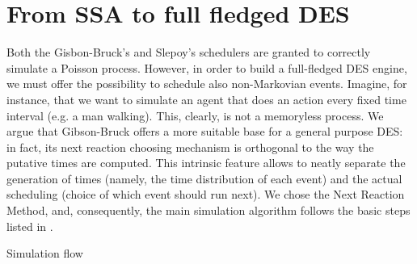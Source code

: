 \documentclass[12pt,a4paper,twoside,openright]{book}
\begin{document}
\section{From SSA to full fledged DES}

Both the Gisbon-Bruck's and Slepoy's schedulers are granted to correctly simulate a Poisson process.
%
However, in order to build a full-fledged DES engine, we must offer the possibility to schedule also non-Markovian events.
%
Imagine, for instance, that we want to simulate an agent that does an action every fixed time interval (e.g. a man walking).
%
This, clearly, is not a memoryless process.
%
We argue that Gibson-Bruck offers a more suitable base for a general purpose DES: in fact, its next reaction choosing mechanism is orthogonal to the way the putative times are computed.
%
This intrinsic feature allows to neatly separate the generation of times (namely, the time distribution of each event) and the actual scheduling (choice of which event should run next).
%
We chose the Next Reaction Method, and, consequently, the main simulation algorithm follows the basic steps listed in .

\begin{algorithm}
\begin{distribalgo}[1]
\vspace{5pt}
  \ENDFOR
\ENDFOR
{}
      \ENDFOR
    \ENDIF
\ENDWHILE
\caption{Simulation flow}
\label{algo:engine}
\end{distribalgo}
\end{algorithm}
\end{document}
